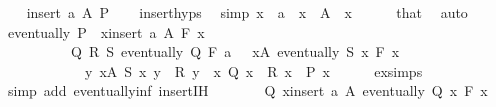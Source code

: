 \begin{isabellebody}
\ \ \isamarkupfalse%
\ {\isacharparenleft}{\kern0pt}insert\ a\ A\ P{\isacharparenright}{\kern0pt}\isanewline
\ \ \isamarkupfalse%
\ insert{\isachardot}{\kern0pt}hyps\ \isamarkupfalse%
\ {\isacharbrackleft}{\kern0pt}simp{\isacharbrackright}{\kern0pt}{\isacharcolon}{\kern0pt}\ {\isachardoublequoteopen}x\ {\isasymnoteq}\ a{\isachardoublequoteclose}\ \ {\isachardoublequoteopen}x\ {\isasymin}\ A{\isachardoublequoteclose}\ \ x\isanewline
\ \ \ \ \isamarkupfalse%
\ that\ \isamarkupfalse%
\ auto\isanewline
\ \ \isamarkupfalse%
\ {\isachardoublequoteopen}eventually\ P\ {\isacharparenleft}{\kern0pt}{\isasymSqinter}\ x{\isasymin}insert\ a\ A{\isachardot}{\kern0pt}\ F\ x{\isacharparenright}{\kern0pt}\ {\isasymlongleftrightarrow}\isanewline
\ \ \ \ \ \ \ \ \ \ {\isacharparenleft}{\kern0pt}{\isasymexists}Q\ R\ S{\isachardot}{\kern0pt}\ eventually\ Q\ {\isacharparenleft}{\kern0pt}F\ a{\isacharparenright}{\kern0pt}\ {\isasymand}\ {\isacharparenleft}{\kern0pt}{\isacharparenleft}{\kern0pt}\ {\isacharparenleft}{\kern0pt}{\isasymforall}x{\isasymin}A{\isachardot}{\kern0pt}\ eventually\ {\isacharparenleft}{\kern0pt}S\ x{\isacharparenright}{\kern0pt}\ {\isacharparenleft}{\kern0pt}F\ x{\isacharparenright}{\kern0pt}{\isacharparenright}{\kern0pt}\ {\isasymand}\isanewline
\ \ \ \ \ \ \ \ \ \ \ \ {\isacharparenleft}{\kern0pt}{\isasymforall}y{\isachardot}{\kern0pt}\ {\isacharparenleft}{\kern0pt}{\isasymforall}x{\isasymin}A{\isachardot}{\kern0pt}\ S\ x\ y{\isacharparenright}{\kern0pt}\ {\isasymlongrightarrow}\ R\ y{\isacharparenright}{\kern0pt}{\isacharparenright}{\kern0pt}\ {\isasymand}\ {\isacharparenleft}{\kern0pt}{\isasymforall}x{\isachardot}{\kern0pt}\ Q\ x\ {\isasymand}\ R\ x\ {\isasymlongrightarrow}\ P\ x{\isacharparenright}{\kern0pt}{\isacharparenright}{\kern0pt}{\isacharparenright}{\kern0pt}{\isachardoublequoteclose}\isanewline
\ \ \ \ \isamarkupfalse%
\ ex{\isacharunderscore}{\kern0pt}simps\ \isamarkupfalse%
\ {\isacharparenleft}{\kern0pt}simp\ add{\isacharcolon}{\kern0pt}\ eventually{\isacharunderscore}{\kern0pt}inf\ insert{\isachardot}{\kern0pt}IH{\isacharparenright}{\kern0pt}\isanewline
\ \ \isamarkupfalse%
\ \isamarkupfalse%
\ {\isachardoublequoteopen}{\isasymdots}\ {\isasymlongleftrightarrow}\ {\isacharparenleft}{\kern0pt}{\isasymexists}Q{\isachardot}{\kern0pt}\ {\isacharparenleft}{\kern0pt}{\isasymforall}x{\isasymin}insert\ a\ A{\isachardot}{\kern0pt}\ eventually\ {\isacharparenleft}{\kern0pt}Q\ x{\isacharparenright}{\kern0pt}\ {\isacharparenleft}{\kern0pt}F\ x{\isacharparenright}{\kern0pt}{\isacharparenright}{\kern0pt}\ {\isasymand}\isanewline

\end{isabellebody}
